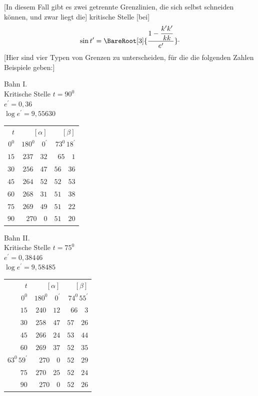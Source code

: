 [In diesem Fall gibt es zwei getrennte Grenzlinien, die sich selbst schneiden können, und zwar liegt die] kritische Stelle [bei]
\[
\sin t^{\prime}=\BareRoot[3]{\frac{1-\dfrac{k^{\prime}k^{\prime}}{kk}}{e^{\prime}}}\mathpunct{\cdot}
\]
[Hier sind vier Typen von Grenzen zu unterscheiden, für die die folgenden Zahlen Beispiele geben:]
\begin{center}
Bahn I.\\[3pt]
Kritische Stelle \(t=90^{0}\)\\
\(e^{\prime}=0{,}36\)\\
\(\log e^{\prime}=9{,}55630\)\par\smallskip
\begin{tabular}{r@{\qquad}r@{\qquad}r}
\(t\)&\([\alpha]\)&\([\beta]\)\\[3pt]
\(0^{0}\)&\(180^{0}\quad0^{\prime}\)&\(73^{0}\,18^{\prime}\)\\
\(15\)&\(237\quad32\)&\(65\quad1\)\\
\(30\)&\(256\quad47\)&\(56\quad36\)\\
\(45\)&\(264\quad52\)&\(52\quad53\)\\
\(60\)&\(268\quad31\)&\(51\quad38\)\\
\(75\)&\(269\quad49\)&\(51\quad22\)\\
\(90\)&\(270\quad0\)&\(51\quad20\)
\end{tabular}
\end{center}
\begin{center}
Bahn II.\\[3pt]
Kritische Stelle \(t=75^{0}\)\\
\(e^{\prime}=0{,}38446\)\\
\(\log e^{\prime}=9{,}58485\)\par\smallskip
\begin{tabular}{r@{\qquad}r@{\qquad}r}
\(t\)&\([\alpha]\)&\([\beta]\)\\[3pt]
\(0^{0}\)&\(180^{0}\quad0^{\prime}\)&\(74^{0}\,55^{\prime}\)\\
\(15\)&\(240\quad12\)&\(66\quad3\)\\
\(30\)&\(258\quad47\)&\(57\quad26\)\\
\(45\)&\(266\quad24\)&\(53\quad44\)\\
\(60\)&\(269\quad37\)&\(52\quad35\)\\
\(63^{0}\,59^{\prime}\)&\(270\quad0\)&\(52\quad29\)\\
\(75\)&\(270\quad25\)&\(52\quad24\)\\
\(90\)&\(270\quad0\)&\(52\quad26\)
\end{tabular}
\end{center}
